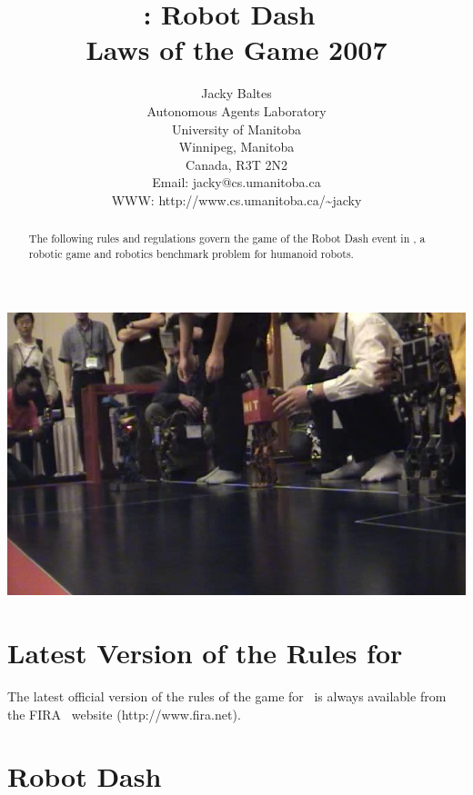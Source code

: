 \documentclass[12pt]{hurocup}
\begin{document}
\title{\HuroCup: Robot Dash\ \\
  Laws of the Game 2007}

\author{Jacky Baltes\\
Autonomous Agents Laboratory\\
University of Manitoba\\
Winnipeg, Manitoba\\
Canada, R3T 2N2\\
Email: jacky@cs.umanitoba.ca\\
WWW: http://www.cs.umanitoba.ca/\~{ }jacky
}

\maketitle

\begin{center}
 \includegraphics[width=0.7\linewidth]{Figures/robot-dash-life}
\end{center}

\begin{abstract}
The following rules and regulations govern the game of the Robot Dash
event in \HuroCup, a robotic game and robotics benchmark problem for
humanoid robots.
%
\end{abstract}

\section*{Latest Version of the Rules for \HuroCup}
\label{sec:updates}

The latest official version of the rules of the game for \HuroCup\ is
always available from the FIRA \HuroCup\ website (http://www.fira.net).

\newpage

\section{Robot Dash}
\label{sec:robot-dash}
\end{document}

